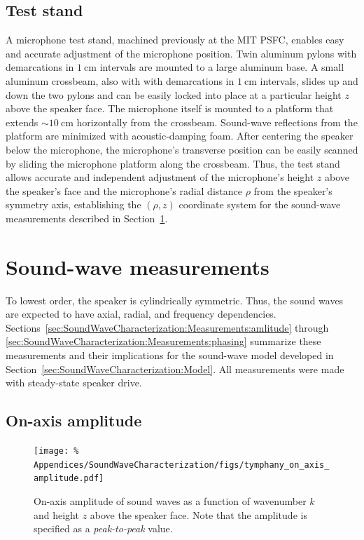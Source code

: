 \subsection{Test stand}
\label{sec:SoundWaveCharacterization:Hardware:test_stand}
A microphone test stand, machined previously at the MIT PSFC,
enables easy and accurate adjustment of the microphone position.
Twin aluminum pylons with demarcations in $\SI{1}{\centi\meter}$ intervals
are mounted to a large aluminum base.
A small aluminum crossbeam,
also with with demarcations in $\SI{1}{\centi\meter}$ intervals,
slides up and down the two pylons and can be easily locked into place
at a particular height $z$ above the speaker face.
The microphone itself is mounted to a platform
that extends $\sim\SI{10}{\centi\meter}$ horizontally
from the crossbeam.
Sound-wave reflections from the platform are minimized
with acoustic-damping foam.
After centering the speaker below the microphone,
the microphone's transverse position can be easily scanned
by sliding the microphone platform along the crossbeam.
Thus, the test stand allows accurate and independent adjustment of
the microphone's height $z$ above the speaker's face and
the microphone's radial distance $\rho$ from the speaker's symmetry axis,
establishing the $(\rho, z)$ coordinate system
for the sound-wave measurements described in
Section~\ref{sec:SoundWaveCharacterization:Measurements}.


\section{Sound-wave measurements}
\label{sec:SoundWaveCharacterization:Measurements}
To lowest order, the speaker is cylindrically symmetric.
Thus, the sound waves are expected to have
axial, radial, and frequency dependencies.
Sections~\ref{sec:SoundWaveCharacterization:Measurements:amlitude} through
\ref{sec:SoundWaveCharacterization:Measurements:phasing}
summarize these measurements and their implications
for the sound-wave model developed in
Section~\ref{sec:SoundWaveCharacterization:Model}.
All measurements were made with steady-state speaker drive.


\subsection{On-axis amplitude}
\begin{figure}
  \centering
  \texttt{[image: \%
    Appendices/SoundWaveCharacterization/figs/tymphany\_on\_axis\_amplitude.pdf]}
  \caption[On-axis amplitude of sound waves]{%
    On-axis amplitude of sound waves as a function of
    wavenumber $k$ and height $z$ above the speaker face.
    Note that the amplitude is specified
    as a \emph{peak-to-peak} value.
  }
\label{fig:SoundWaveCharacterization:tymphany_on_axis_amplitude}
\end{figure}

